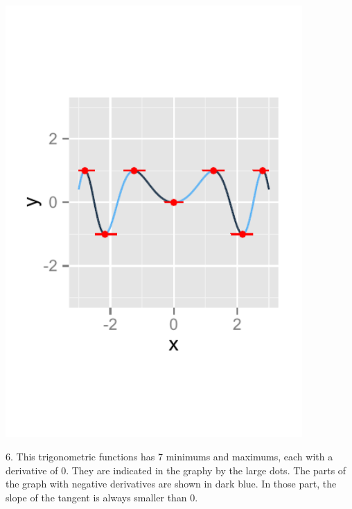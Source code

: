 \documentclass[a4paper]{report}
\begin{document}
\begin{Answer}[ref=ex0]
\begin{minipage}{\rat\textwidth}
\includegraphics[width=0.85\textwidth]{1ag.pdf}
\end{minipage}
\begin{minipage}{\rati\textwidth}
6. This trigonometric functions has 7 minimums and maximums, each with a derivative of $0$. They are indicated in the graphy by the large dots. The parts of the graph with negative derivatives are shown in dark blue. In those part, the slope of the tangent is always smaller than $0$.
\end{minipage}
\end{Answer}
\end{document}
